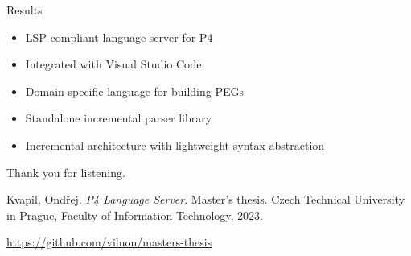 \documentclass[aspectratio=169]{beamer}
\begin{document}
\begin{frame}{Results}
	\begin{itemize}
		\item LSP-compliant \alert{language server} for P4 \pause
		\item Integrated with Visual Studio Code \pause
		\item Domain-specific language for building PEGs \pause
		\item Standalone \alert{incremental parser library} \pause
		\item Incremental architecture with lightweight syntax abstraction
			\pause
	\end{itemize}

	Thank you for listening.
\end{frame}

\begin{frame}{}
	\begin{thebibliography}{1}
		Kvapil, Ondřej.
		\textit{P4 Language Server}.
		Master's thesis.
		Czech Technical University in Prague,
		Faculty of Information Technology, 2023.
	\end{thebibliography}

	\url{https://github.com/viluon/masters-thesis}
\end{frame}
\end{document}
